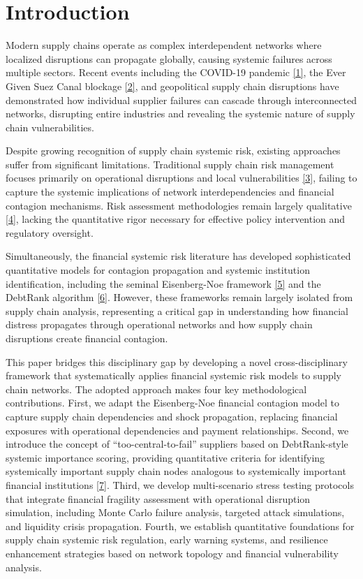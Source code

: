 \documentclass[a4 paper, 11pt,twoside]{article}
\newcommand{\0}{\Bf{0}}
\theoremstyle{definition}
\begin{document}
\section{Introduction}

Modern supply chains operate as complex interdependent networks where localized disruptions can propagate globally, causing systemic failures across multiple sectors. Recent events including the COVID-19 pandemic \hyperref[ref1]{[1]}, the Ever Given Suez Canal blockage \hyperref[ref2]{[2]}, and geopolitical supply chain disruptions have demonstrated how individual supplier failures can cascade through interconnected networks, disrupting entire industries and revealing the systemic nature of supply chain vulnerabilities.

Despite growing recognition of supply chain systemic risk, existing approaches suffer from significant limitations. Traditional supply chain risk management focuses primarily on operational disruptions and local vulnerabilities \hyperref[ref3]{[3]}, failing to capture the systemic implications of network interdependencies and financial contagion mechanisms. Risk assessment methodologies remain largely qualitative \hyperref[ref4]{[4]}, lacking the quantitative rigor necessary for effective policy intervention and regulatory oversight.

Simultaneously, the financial systemic risk literature has developed sophisticated quantitative models for contagion propagation and systemic institution identification, including the seminal Eisenberg-Noe framework \hyperref[ref5]{[5]} and the DebtRank algorithm \hyperref[ref6]{[6]}. However, these frameworks remain largely isolated from supply chain analysis, representing a critical gap in understanding how financial distress propagates through operational networks and how supply chain disruptions create financial contagion.

This paper bridges this disciplinary gap by developing a novel cross-disciplinary framework that systematically applies financial systemic risk models to supply chain networks. The adopted approach makes four key methodological contributions. First, we adapt the Eisenberg-Noe financial contagion model to capture supply chain dependencies and shock propagation, replacing financial exposures with operational dependencies and payment relationships. Second, we introduce the concept of ``too-central-to-fail'' suppliers based on DebtRank-style systemic importance scoring, providing quantitative criteria for identifying systemically important supply chain nodes analogous to systemically important financial institutions \hyperref[ref7]{[7]}. Third, we develop multi-scenario stress testing protocols that integrate financial fragility assessment with operational disruption simulation, including Monte Carlo failure analysis, targeted attack simulations, and liquidity crisis propagation. Fourth, we establish quantitative foundations for supply chain systemic risk regulation, early warning systems, and resilience enhancement strategies based on network topology and financial vulnerability analysis.
\end{document}
